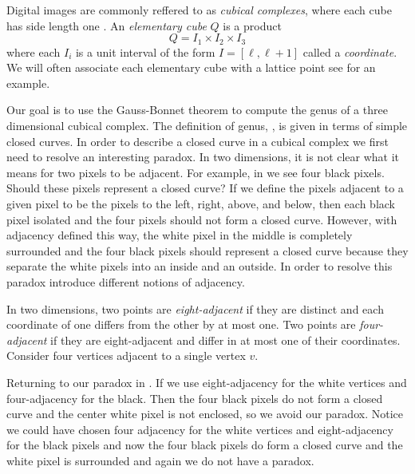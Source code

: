 Digital images are commonly reffered to as \emph{cubical complexes},
where each cube has side length one \cite{kong_digital_1989}.
An \emph{elementary cube} $Q$ is a product
$$Q=I_1\times I_2 \times I_3$$
where each $I_i$ is a unit interval of the form $I=[\ell,\ell+1]$
called a \emph{coordinate}.
We will often associate each elementary cube with a lattice point
see  for an example.

Our goal is to use the Gauss-Bonnet theorem to compute
the genus of a three dimensional cubical complex.
The definition of genus, , is given in terms
of simple closed curves. In order to describe a closed curve in a cubical
complex we first need to resolve an interesting paradox.
In two dimensions, it is not clear what it means
for two pixels to be adjacent. For example, in 
we see four black pixels. Should these pixels represent a closed
curve? If we define the pixels adjacent to a given pixel to be the 
pixels to the left, right, above, and below, then each black pixel isolated
and the four pixels should not form a closed curve. However,
with adjacency defined this way, the white pixel in the middle is completely surrounded 
and the four black pixels should represent a closed curve because
they separate the white pixels into an inside and an outside.
In order to resolve this paradox introduce different notions of adjacency.


In two dimensions, two points are \emph{eight-adjacent}
if they are distinct and each coordinate of one differs from
the other by at most one.
Two points are \emph{four-adjacent} if
they are eight-adjacent and differ in at most one of their coordinates.
Consider four vertices adjacent to a single vertex $v$.

Returning to our paradox in .
If we use eight-adjacency
for the white vertices and four-adjacency for the black.
Then the four black pixels do not form a closed curve 
and the center white pixel is not enclosed, so we avoid our paradox. 
Notice we could have chosen four adjacency
for the white vertices and eight-adjacency for the black pixels and 
now the four black pixels do form a closed curve and the white pixel
is surrounded and again we do not have a paradox.



